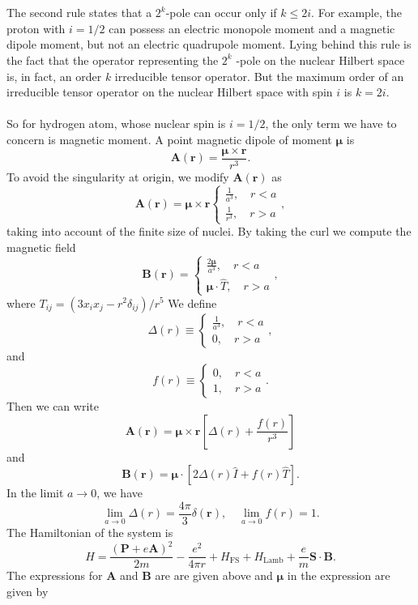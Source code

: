 \\ \\
The second rule states that a $2^k$-pole can occur only if $k \leq 2i$. For example, the proton with $i = {1}/{2}$ can possess an electric monopole moment and a magnetic dipole moment, but not an electric quadrupole moment. Lying behind this rule is the fact that the operator representing the $2^k$ -pole on the nuclear Hilbert space is, in fact, an order $k$ irreducible tensor operator. But the maximum order of an irreducible tensor operator on the nuclear Hilbert space with
spin $i$ is $k = 2i$.
\\ \\
So for hydrogen atom, whose nuclear spin is $i = {1}/{2}$, the only term we have to concern is magnetic moment. A point magnetic dipole of moment $\bm{\mu}$ is
\[\bm{A}(\bm{r}) = \frac{\bm{\mu}\times\bm{r}}{r^3}.\]
To avoid the singularity at origin, we modify $\bm{A}(\bm{r})$ as
\[\bm{A}(\bm{r}) = \bm{\mu}\times\bm{r} \begin{cases} \frac{1}{a^3} , \quad r < a\\ \frac{1}{r^3} , \quad r > a\end{cases} ,\]
taking into account of the finite size of nuclei. 
By taking the curl we compute the magnetic field
\[\bm{B}(\bm{r}) =  \begin{cases} \frac{2\bm{\mu}}{a^3} , \quad r < a\\ \bm{\mu}\cdot\hat{T} , \quad r > a\end{cases} ,\]
where $T_{ij} = (3x_ix_j-r^2\delta_{ij})/{r^5}$
We define
\[\Delta(r) \equiv \begin{cases} \frac{1}{a^3} , \quad r < a\\ 0 , \quad r > a\end{cases},\]
and
\[f(r) \equiv \begin{cases} 0 , \quad r < a\\ 1 , \quad r > a\end{cases}.\]
Then we can write
\[\bm{A}(\bm{r}) = \bm{\mu}\times\bm{r} \left [\Delta(r) + \frac{f(r)}{r^3}\right ] \]
and
\[\bm{B}(\bm{r}) = \bm{\mu}\cdot \left [2\Delta(r)\hat{I} + f(r)\hat{T}\right ] .\]
In the limit $a \to 0$, we have
\[\lim_{a \to 0} \Delta(r) = \frac{4\pi}{3}\delta(\bm{r}) , \quad \lim_{a \to 0} f(r) = 1.\]
The Hamiltonian of the system is
\[H = \frac{(\bm{P}+e\bm{A})^2}{2m} - \frac{e^2}{4\pi r} + H_{\mathrm{FS}} + H_{\mathrm{Lamb}} + \frac{e}{m}\bm{S}\cdot\bm{B}.\]
The expressions  for $\bm{A}$ and $\bm{B}$ are are given above and $\bm{\mu}$ in the expression are given by
